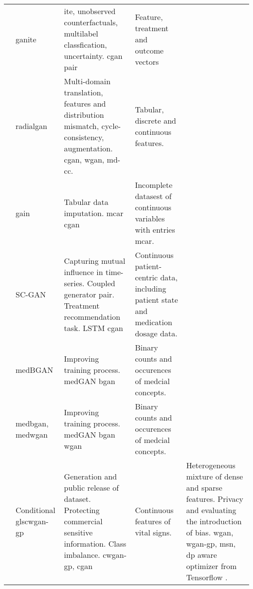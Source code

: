 \begin{sidewaystable}[htbp]
\begin{tabularx}{\textwidth}{@{}p{4cm}XXX@{}}
            \cite{Yoon2018-ite} 
            & \gls{ganite} 
            & \gls{ite}, unobserved counterfactuals, multilabel classfication, uncertainty. \gls{cgan} pair
            & Feature, treatment and outcome vectors\\
            
            \cite{Yoon2018-radial}
            & \gls{radialgan} 
            & Multi-domain translation, features and distribution mismatch, cycle-consistency, augmentation. \gls{cgan}, \gls{wgan}, \gls{md-cc}.
            & Tabular, discrete and continuous features.\\
            
            \cite{yoon2018imputation}
            & \gls{gain}
            & Tabular data imputation. \gls{mcar} \gls{cgan}
            & Incomplete datasest of continuous variables with entries \gls{mcar}.\\
            
            
            \cite{Wang_2019}
            & \gls{SC-GAN}
            & Capturing mutual influence in time-series. Coupled generator pair. Treatment recommendation task.  \gls{LSTM} \gls{cgan}
            & Continuous patient-centric data, including patient state and medication dosage data.\\
            
        
            
            \cite{baowaly_2019_IEEE}
            & \gls{medBGAN}
            & Improving training process. \gls{medGAN} \gls{bgan}
            & Binary counts and occurences of medcial concepts.\\
            
            \cite{baowaly_2019_jamia}
            & \gls{medbgan}, \gls{medwgan}
            & Improving training process. \gls{medGAN} \gls{bgan} \gls{wgan}
            & Binary counts and occurences of medcial concepts.\\
            
            \cite{severo2019ward2icu}
            & Conditional gls{cwgan-gp} 
            & Generation and public release of dataset. Protecting commercial sensitive information. Class imbalance. \gls{cwgan-gp}, \gls{cgan}
            & Continuous features of vital signs.
            
            \cite{chin2019generation}
            & Heterogeneous mixture of dense and sparse features. Privacy and evaluating the introduction of bias. \gls{wgan}, \gls{wgan-gp}, 					\gls{msn}, \gls{dp} aware optimizer from Tensorflow \cite{tensorflow-privacy}.
            

\end{tabularx}
\end{sidewaystable}
